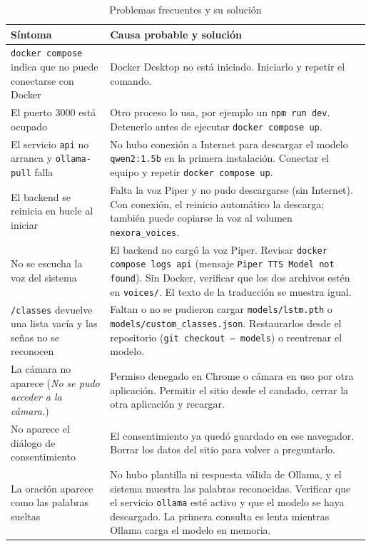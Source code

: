 \begin{table}[H]
  \centering
  \caption{Problemas frecuentes y su solución}\label{tab:problemas}
  \small
  \begin{tabularx}{\textwidth}{>{\raggedright\arraybackslash}p{4.4cm} X}
    \toprule
    \textbf{Síntoma} & \textbf{Causa probable y solución} \\
    \midrule
    \texttt{docker compose} indica que no puede conectarse con Docker & Docker Desktop no está iniciado. Iniciarlo y repetir el comando. \\
    El puerto 3000 está ocupado & Otro proceso lo usa, por ejemplo un \texttt{npm run dev}. Detenerlo antes de ejecutar \texttt{docker compose up}. \\
    El servicio \texttt{api} no arranca y \texttt{ollama-pull} falla & No hubo conexión a Internet para descargar el modelo \texttt{qwen2:1.5b} en la primera instalación. Conectar el equipo y repetir \texttt{docker compose up}. \\
    El backend se reinicia en bucle al iniciar & Falta la voz Piper y no pudo descargarse (sin Internet). Con conexión, el reinicio automático la descarga; también puede copiarse la voz al volumen \texttt{nexora\_voices}. \\
    No se escucha la voz del sistema & El backend no cargó la voz Piper. Revisar \texttt{docker compose logs api} (mensaje \texttt{Piper TTS Model not found}). Sin Docker, verificar que los dos archivos estén en \texttt{voices/}. El texto de la traducción se muestra igual. \\
    \texttt{/classes} devuelve una lista vacía y las señas no se reconocen & Faltan o no se pudieron cargar \texttt{models/lstm.pth} o \texttt{models/custom\_classes.json}. Restaurarlos desde el repositorio (\texttt{git checkout -- models}) o reentrenar el modelo. \\
    La cámara no aparece (\emph{No se pudo acceder a la cámara.}) & Permiso denegado en Chrome o cámara en uso por otra aplicación. Permitir el sitio desde el candado, cerrar la otra aplicación y recargar. \\
    No aparece el diálogo de consentimiento & El consentimiento ya quedó guardado en ese navegador. Borrar los datos del sitio para volver a preguntarlo. \\
    La oración aparece como las palabras sueltas & No hubo plantilla ni respuesta válida de Ollama, y el sistema muestra las palabras reconocidas. Verificar que el servicio \texttt{ollama} esté activo y que el modelo se haya descargado. La primera consulta es lenta mientras Ollama carga el modelo en memoria. \\

\end{tabularx}
\end{table}
